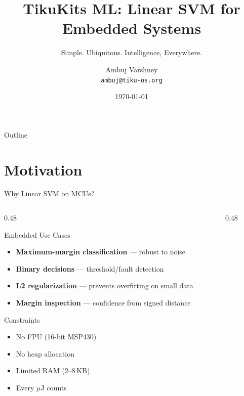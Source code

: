 \documentclass[aspectratio=169, 10pt]{beamer}
\title[TikuKits ML]{TikuKits ML: Linear SVM for Embedded Systems}
\subtitle{Simple. Ubiquitous. Intelligence, Everywhere.}
\author[Ambuj Varshney]{Ambuj Varshney \\ \texttt{ambuj@tiku-os.org}}
\date{\today}
\begin{document}
\begin{frame}
\titlepage
\end{frame}

\begin{frame}{Outline}
\tableofcontents
\end{frame}

\section{Motivation}

\begin{frame}{Why Linear SVM on MCUs?}
\begin{columns}[T]
\begin{column}{0.48\textwidth}
\begin{block}{Embedded Use Cases}
\begin{itemize}
  \item \textbf{Maximum-margin classification} --- robust to noise
  \item \textbf{Binary decisions} --- threshold/fault detection
  \item \textbf{L2 regularization} --- prevents overfitting on small data
  \item \textbf{Margin inspection} --- confidence from signed distance
\end{itemize}
\end{block}

\begin{block}{Constraints}
\begin{itemize}
  \item No FPU (16-bit MSP430)
  \item No heap allocation
  \item Limited RAM (2--8\,KB)
  \item Every $\mu$J counts
\end{itemize}
\end{block}
\end{column}

\begin{column}{0.48\textwidth}
\begin{center}
\end{center}
\end{column}
\end{columns}
\end{frame}
\end{document}
